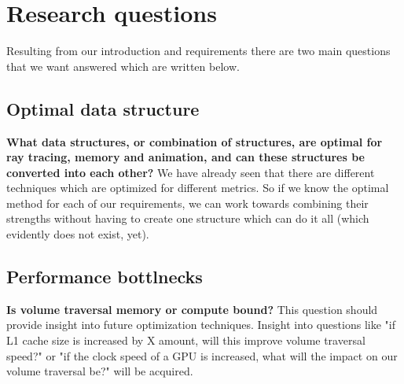 \section{Research questions}\label{research_questions}
Resulting from our introduction and requirements there are two main questions that we want answered which are written below.

\subsection{Optimal data structure}\label{research_questions:optimal_data_structure}

\noindent\textbf{What data structures, or combination of structures, are optimal for ray tracing, memory and animation, and can these structures be converted into each other?} We have already seen that there are different techniques which are optimized for different metrics. So if we know the optimal method for each of our requirements, we can work towards combining their strengths without having to create one structure which can do it all (which evidently does not exist, yet).

\subsection{Performance bottlnecks}\label{research_questions:performance_bottlenecks}
\noindent\textbf{Is volume traversal memory or compute bound?} This question should provide insight into future optimization techniques. Insight into questions like "if L1 cache size is increased by X amount, will this improve volume traversal speed?" or "if the clock speed of a GPU is increased, what will the impact on our volume traversal be?" will be acquired.

